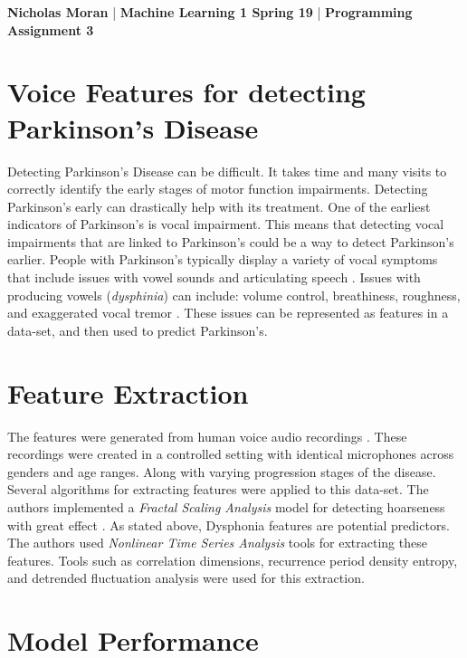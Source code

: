 \setlength{\parindent}{10ex}

\textbf{Nicholas Moran} |
\textbf{Machine Learning 1 Spring 19} |
\textbf{Programming Assignment 3} 

\section{Voice Features for detecting Parkinson's Disease}
    Detecting Parkinson's Disease can be difficult. 
    It takes time and many visits to correctly identify the early stages of motor function impairments.
    Detecting Parkinson's early can drastically help with its treatment.
    One of the earliest indicators of Parkinson's is vocal impairment.
    This means that detecting vocal impairments that are linked to Parkinson's could be a way to detect Parkinson's  earlier.
    People with Parkinson's typically display a variety of vocal symptoms that include issues with vowel sounds and articulating speech \cite{little}.
    Issues with producing vowels (\textit{dysphinia}) can include: volume control, breathiness, roughness, and exaggerated vocal tremor \cite{little}.
    These issues can be represented as features in a data-set, and then used to predict Parkinson's.


\section{Feature Extraction}
    The features were generated from human voice audio recordings \cite{little}.
    These recordings were created in a controlled setting with identical microphones across genders and age ranges.
    Along with varying progression stages of the disease. 
    Several algorithms for extracting features were applied to this data-set.
    The authors implemented a \textit{Fractal Scaling Analysis} model for detecting hoarseness with great effect \cite{McSharry}.
    As stated above, Dysphonia features are potential predictors. 
    The authors used \textit{Nonlinear Time Series Analysis} tools for extracting these features.
    Tools such as correlation dimensions, recurrence period density entropy, and detrended fluctuation analysis were used for this extraction.





\section{Model Performance}

